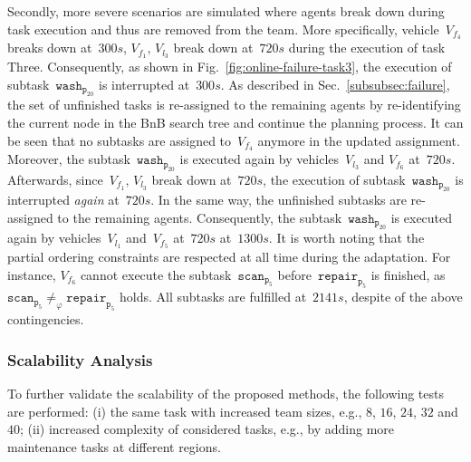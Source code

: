 Secondly, more severe scenarios are simulated where agents break down
during task execution and thus are removed from the team.
More specifically, vehicle~$V_{f_4}$ breaks down at~$300s$, $V_{f_1},\, V_{l_3}$ break
down at~$720s$ during the execution of task Three.
Consequently, as shown in Fig.~\ref{fig:online-failure-task3},
the execution of subtask~$\texttt{wash}_{\texttt{p}_{20}}$ is interrupted at~$300s$.
As described in Sec.~\ref{subsubsec:failure},
the set of unfinished tasks is re-assigned to the remaining agents by re-identifying
the current node in the BnB search tree and continue the planning process.
It can be seen that no subtasks are assigned to~$V_{f_4}$ anymore in the updated assignment.
Moreover, the subtask~$\texttt{wash}_{\texttt{p}_{20}}$ is executed again
by vehicles~$V_{l_3}$ and $V_{f_6}$ at~$720s$.
Afterwards, since~$V_{f_1},\, V_{l_3}$ break down at~$720s$,
the execution of subtask~$\texttt{wash}_{\texttt{p}_{20}}$ is interrupted \emph{again} at~$720s$.
In the same way, the unfinished subtasks are re-assigned to the remaining agents.
Consequently, the subtask~$\texttt{wash}_{\texttt{p}_{20}}$ is executed again
by vehicles~$V_{l_1}$ and~$V_{f_5}$ at~$720s$ at~$1300s$.
It is worth noting that the partial ordering constraints are respected at all
time during the adaptation.
For instance, $V_{f_6}$ cannot execute the subtask~$\texttt{scan}_{\texttt{p}_5}$
before~$\texttt{repair}_{\texttt{p}_5}$ is finished,
as~$\texttt{scan}_{\texttt{p}_5}\neq_\varphi \texttt{repair}_{\texttt{p}_5}$ holds.
All subtasks are fulfilled at~$2141s$, despite of the above contingencies.



\subsubsection{Scalability Analysis}\label{subsubsec:scalable}
To further validate the scalability of the proposed methods,
the following tests are performed:
(i) the same task with increased team sizes,
e.g., $8$, $16$, $24$, $32$ and $40$;
(ii) increased complexity of considered tasks, e.g.,
by adding more maintenance tasks at different regions.

